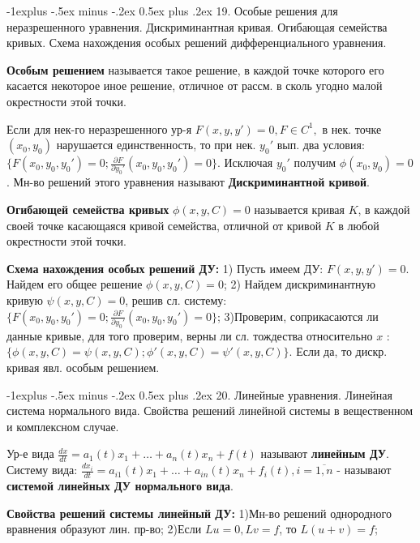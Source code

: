 \documentclass[unicode,10pt, landscape]{article}
\makeatletter
\renewcommand{\subsection}{\@startsection{subsection}{2}{0mm}%
                                {-1explus -.5ex minus -.2ex}%
                                {0.5ex plus .2ex}%
                                {\normalfont\normalsize\bfseries}}
\makeatother
\begin{document}

\subsection{19. Особые решения для неразрешенного уравнения. Дискриминантная кривая. Огибающая семейства кривых. Схема нахождения особых решений дифференциального уравнения.}
\begin{Def}
{\bf Особым решением} называется такое решение, в каждой точке которого его касается некоторое иное решение, отличное от рассм. в сколь угодно малой окрестности этой точки.
\end{Def}
\begin{Def}
Если для нек-го неразрешенного ур-я $F(x, y, y') = 0, F \in C^1,$ в нек. точке $(x_0, y_0)$ нарушается единственность, то при нек. $y_0'$ вып. два условия: $\{F(x_0, y_0, y_0') = 0; \frac{\partial F}{\partial y_0'}(x_0, y_0, y_0') = 0\}$. Исключая $y_0'$ получим $\phi(x_0, y_0) = 0$. Мн-во решений этого уравнения называют {\bf Дискриминантной кривой}.
\end{Def}
\begin{Def}
{\bf Огибающей семейства кривых} $\phi(x,y,C) = 0$ называется кривая $K$, в каждой своей точке касающаяся кривой семейства, отличной от кривой $K$ в любой окрестности этой точки.
\end{Def}
{\bf Схема нахождения особых решений ДУ:} 
1) Пусть имеем ДУ: $F(x,y,y') = 0$. Найдем его общее решение $\phi(x,y,C) = 0$; 2) Найдем дискриминантную кривую $\psi(x,y,C) = 0$, решив сл. систему: $\{F(x_0, y_0, y_0') = 0; \frac{\partial F}{\partial y_0'}(x_0, y_0, y_0') = 0\}$; 3)Проверим, соприкасаются ли данные кривые, для того проверим, верны ли сл. тождества относительно $x$ : $\{\phi(x,y,C) = \psi(x,y,C); \phi'(x,y,C) = \psi'(x,y,C)\}$. Если да, то дискр. кривая явл. особым решением.


\subsection{20. Линейные уравнения. Линейная система нормального вида. Свойства решений линейной системы в вещественном и комплексном случае.}
\begin{Def}
Ур-е вида $\frac{dx}{dt} = a_1(t)x_1 + \ldots + a_n(t)x_n + f(t)$ называют {\bf линейным ДУ}.
Систему вида: $\frac{dx_i}{dt}  = a_{i1}(t)x_1 + \ldots + a_{in}(t)x_n + f_i(t), i = \overline{1,n}$ - называют {\bf системой линейных ДУ нормального вида}.
\end{Def}
{\bf Свойства решений системы линейный ДУ:}
1)Мн-во решений однородного вравнения образуют лин. пр-во;
2)Если $Lu = 0, Lv = f$, то $L(u + v) = f$;
\end{document}
